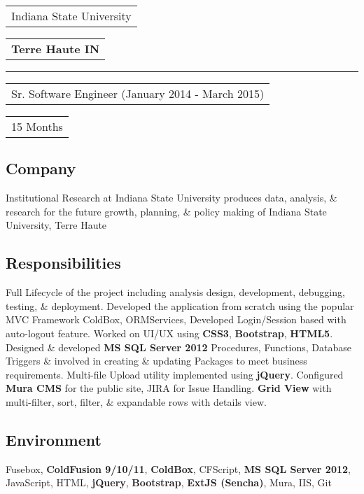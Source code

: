 \documentclass[letterpaper,11pt]{article}
\begin{document}


    \vspace{1.27cm}
    \noindent
    \begin{tabular}[t]{@{}l}
    \Large{Indiana State University}
    \end{tabular}
    \hfill
    \begin{tabular}[t]{l@{}}
    \textbf{\color{darkgray}Terre Haute IN}
    \end{tabular}
    \noindent\rule{\textwidth}{0.5pt}
    \begin{tabular}[t]{@{}l}
    Sr. Software Engineer (January 2014 - March 2015)
    \end{tabular}
    \hfill
    \begin{tabular}[t]{l@{}}
    15 Months
    \end{tabular}

    \subsection{Company}
    Institutional Research at Indiana State University produces data, analysis, \& research for the future growth, planning, \& policy making of Indiana State University, Terre Haute

    \subsection{Responsibilities}
    Full Lifecycle of the project including analysis design, development, debugging, testing, \& deployment. Developed the application from scratch using the popular MVC Framework ColdBox, ORMServices, Developed Login/Session based with auto-logout feature. Worked on UI/UX using \textbf{\color{darkgray}CSS3}, \textbf{\color{darkgray}Bootstrap}, \textbf{\color{darkgray}HTML5}. Designed \& developed \textbf{\color{darkgray}MS SQL Server 2012} Procedures, Functions, Database Triggers \& involved in creating \& updating Packages to meet business requirements. Multi-file Upload utility implemented using \textbf{\color{darkgray}jQuery}. Configured \textbf{\color{darkgray}Mura CMS} for the public site, JIRA for Issue Handling. \textbf{\color{darkgray}Grid View} with multi-filter, sort, filter, \& expandable rows with details view.

    \subsection{Environment}
    Fusebox, \textbf{\color{darkgray}ColdFusion 9/10/11}, \textbf{\color{darkgray}ColdBox}, CFScript, \textbf{\color{darkgray}MS SQL Server 2012}, JavaScript, HTML, \textbf{\color{darkgray}jQuery}, \textbf{\color{darkgray}Bootstrap}, \textbf{\color{darkgray}ExtJS (Sencha)}, Mura, IIS, Git
\end{document}
